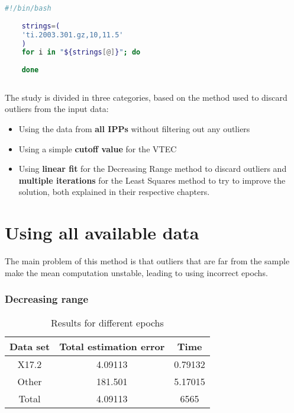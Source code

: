 \begin{minipage}{\linewidth}
	\begin{lstlisting}[language=Bash, caption=Filtering the ti file]
	#!/bin/bash	
	
	strings=(
	'ti.2003.301.gz,10,11.5'
	)
	for i in "${strings[@]}"; do
	
	done
	
	\end{lstlisting}
\end{minipage}

The study is divided in three categories, based on the method used to discard outliers from the input data:

\begin{itemize}
	\item Using the data from \textbf{all IPPs} without filtering out any outliers
	\item Using a simple \textbf{cutoff value} for the VTEC
	\item Using \textbf{linear fit} for the Decreasing Range method to discard outliers and \textbf{multiple iterations} for the Least Squares method to try to improve the solution, both explained in their respective chapters.
\end{itemize}

\section{Using all available data}

The main problem of this method is that outliers that are far from the sample make the mean computation unstable, leading to using incorrect epochs.

\subsubsection{Decreasing range}

\begin{table}[h!]
	\centering
	\def\arraystretch{1.2}
	\begin{tabular}{|c c c|} 
		\hline
		Data set & Total estimation error & Time \\ [0.5ex] 
		\hline\hline
		X17.2  & 4.09113 & 0.79132 \\
		\hline
		Other & 181.501 & 5.17015 \\
		\hline\hline
		Total & 4.09113 & 6565 \\
		\hline
	\end{tabular}
	\caption{Results for different epochs}
\end{table}

